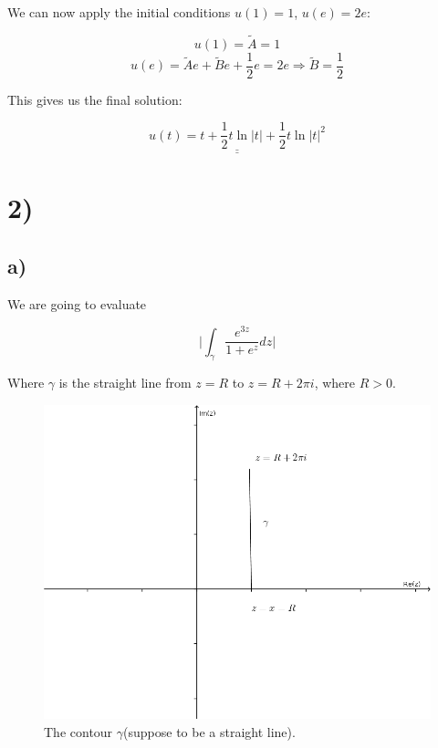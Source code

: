 \documentclass[a4paper,norsk, 10pt]{article}
\begin{document}
We can now apply the initial conditions $u(1) = 1$, $u(e) = 2e$:

$$
u(1) = \tilde{A} = 1 
$$
$$
u(e) = \tilde{A}e + \tilde{B}e + \frac{1}{2}e = 2e \Rightarrow \tilde{B} = \frac{1}{2}
$$

This gives us the final solution:

\begin{equation}
\underline{\underline{u(t) = t +\frac{1}{2}t\ln |t| + \frac{1}{2}t\ln |t|^2}}
\end{equation}
\newpage

\section*{2)}

\subsection*{a)}

We are going to evaluate 

$$
\bigg| \int_{\gamma} \frac{e^{3z}}{1+e^z} dz \bigg| 
$$

Where $\gamma$ is the straight line from $z = R$ to $z = R + 2\pi i$, where $R > 0$.\\

\begin{figure}[H]
\centering
\includegraphics[scale=0.4]{2a.png}
\caption{The contour $\gamma$(suppose to be a straight line).}
\end{figure}
\end{document}
